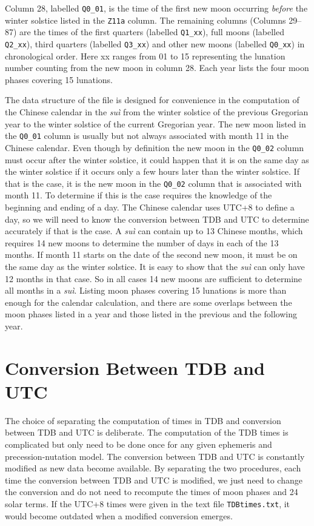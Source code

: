 \documentclass[12pt]{article}
\begin{document}
\begin{CJK}{UTF8}{bkai}
Column 28, labelled {\tt Q0\_01}, is the time of the first new moon occurring {\em before} 
the winter solstice listed in the {\tt Z11a} column. The remaining columns 
(Columns 29--87) are the times of the first quarters (labelled {\tt Q1\_xx}), 
full moons (labelled {\tt Q2\_xx}), third quarters (labelled {\tt Q3\_xx}) and 
other new moons (labelled {\tt Q0\_xx}) in chronological order. Here xx 
ranges from 01 to 15 representing the lunation number counting from the new moon 
in column 28. Each year lists the four moon phases covering 15 lunations.

The data structure of the file is designed for convenience in the computation of 
the Chinese calendar in the {\it su\`i} from the winter solstice of the previous 
Gregorian year to the winter solstice of the current Gregorian year. The new moon 
listed in the {\tt Q0\_01} column is usually but not always associated with 
month 11 in the Chinese calendar. Even though by definition the new moon in 
the {\tt Q0\_02} column must occur after the winter solstice, it could happen that 
it is on the same day as the winter solstice if it occurs only a few hours 
later than the winter solstice. If that is the case, it is the new moon in 
the {\tt Q0\_02} column that is associated with month 11. To determine if 
this is the case requires the knowledge of the beginning and ending of a day. 
The Chinese calendar uses UTC+8 to define a day, so we will need to know 
the conversion between TDB and UTC to determine accurately if that is the case. 
A {\it su\`i} can contain up to 13 Chinese months, which requires 14 new moons 
to determine the number of days in each of the 13 months. If month 11 starts 
on the date of the second new moon, it must be on the same day as the winter 
solstice. It is easy to show that the {\it su\`i} can only have 12 months 
in that case. 
So in all cases 14 new moons are sufficient to determine all months in a {\it su\`i}. 
Listing moon phases covering 15 lunations is more than enough for the calendar 
calculation, and there are some overlaps between the moon phases listed in a year 
and those listed in the previous and the following year.

\section{Conversion Between TDB and UTC}
\label{sec:UTC}

The choice of separating
the computation of times in TDB and conversion between TDB and UTC is
deliberate. The computation of the TDB times is complicated but only need to be
done once for any given ephemeris and precession-nutation model. The conversion
between TDB and UTC is constantly modified as new data become available.
By separating the two procedures, each time the conversion between TDB and UTC
is modified, we just need to change the conversion and do not need to recompute
the times of moon phases and 24 solar terms. If the UTC+8 times were given 
in the text file {\tt TDBtimes.txt}, it would become
outdated when a modified conversion emerges. 


\end{CJK}
\end{document}

